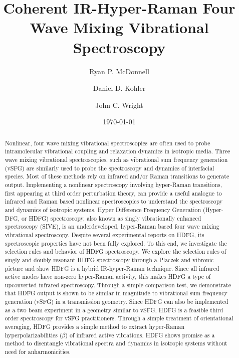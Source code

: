 \documentclass[aip, jcp, reprint, onecolumn]{revtex4-2}
\begin{document}
\title{Coherent IR-Hyper-Raman Four Wave Mixing Vibrational Spectroscopy}


\author{Ryan P. McDonnell} 
\author{Daniel D. Kohler}
\author{John C. Wright} 


\date{\today}

\begin{abstract}
Nonlinear, four wave mixing vibrational spectroscopies are often used to probe intramolecular vibrational coupling and relaxation dynamics in isotropic media.
Three wave mixing vibrational spectroscopies, such as vibrational sum frequency generation (vSFG) are similarly used to probe the spectroscopy and dynamics of interfacial species.
Most of these methods rely on infrared and/or Raman transitions to generate output. 
Implementing a nonlinear spectroscopy involving hyper-Raman transitions, first appearing at third order perturbation theory, can provide a useful analogue to infrared and Raman based nonlinear spectroscopies to understand the spectroscopy and dynamics of isotropic systems.
Hyper Difference Frequency Generation (Hyper-DFG, or HDFG) spectroscopy, also known as singly vibrationally enhanced spectroscopy (SIVE), is an underdeveloped, hyper-Raman based four wave mixing vibrational spectroscopy. 
Despite several experimental reports on HDFG, its spectroscopic properties have not been fully explored.
To this end, we investigate the selection rules and behavior of HDFG spectroscopy.
We explore the selection rules of singly and doubly resonant HDFG spectroscopy through a Placzek and vibronic picture and show HDFG is a hybrid IR-hyper-Raman technique.
Since all infrared active modes have non-zero hyper-Raman activity, this makes HDFG a type of upconverted infrared spectroscopy.
Through a simple comparison test, we demonstrate that HDFG output is shown to be similar in magnitude to vibrational sum frequency generation (vSFG) in a transmission geometry.
Since HDFG can also be implemented as a two beam experiment in a geometry similar to vSFG, HDFG is a feasible third order spectroscopy for vSFG practitioners.
Through a simple treatment of orientational averaging, HDFG provides a simple method to extract hyper-Raman hyperpolarizabilities ($\beta$) of infrared active vibrations.
HDFG shows promise as a method to disentangle vibrational spectra and dynamics in isotropic systems without need for anharmonicities.

\end{abstract}
\end{document}
